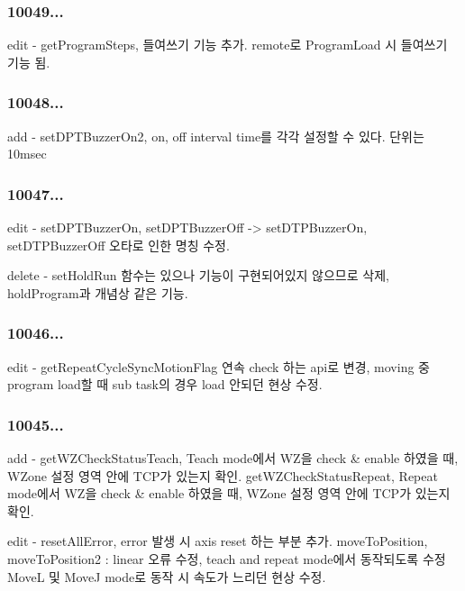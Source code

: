 \subsubsection*{10049...}

\begin{DoxyVerb}      edit - getProgramSteps, 들여쓰기 기능 추가.
             remote로 ProgramLoad 시 들여쓰기 기능 됨.
\end{DoxyVerb}


\subsubsection*{10048...}

\begin{DoxyVerb}       add - setDPTBuzzerOn2, on, off interval time를 각각 설정할 수 있다. 단위는 10msec
\end{DoxyVerb}


\subsubsection*{10047...}

\begin{DoxyVerb}      edit - setDPTBuzzerOn, setDPTBuzzerOff -> setDTPBuzzerOn, setDTPBuzzerOff 오타로 인한 명칭 수정.

    delete - setHoldRun 함수는 있으나 기능이 구현되어있지 않으므로 삭제, holdProgram과 개념상 같은 기능.
\end{DoxyVerb}


\subsubsection*{10046...}

\begin{DoxyVerb}      edit - getRepeatCycleSyncMotionFlag 연속 check 하는 api로 변경, moving 중 program load할 때 sub task의 경우 load 안되던
             현상 수정.
\end{DoxyVerb}


\subsubsection*{10045...}

\begin{DoxyVerb}       add - getWZCheckStatusTeach, Teach mode에서 WZ을 check & enable 하였을 때, WZone 설정 영역 안에 TCP가 있는지 확인.
             getWZCheckStatusRepeat, Repeat mode에서 WZ을 check & enable 하였을 때, WZone 설정 영역 안에 TCP가 있는지 확인.

      edit - resetAllError, error 발생 시 axis reset 하는 부분 추가.
             moveToPosition, moveToPosition2 : linear 오류 수정, teach and repeat mode에서 동작되도록 수정
             MoveL 및 MoveJ mode로 동작 시 속도가 느리던 현상 수정.
\end{DoxyVerb}


